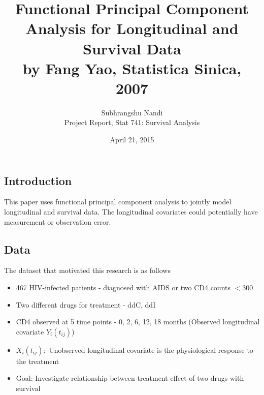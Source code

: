 \documentclass[11pt]{extarticle} %
\begin{document}

\title{Functional Principal Component Analysis for Longitudinal and Survival Data\\ by Fang Yao, Statistica Sinica, 2007}
\author{Subhrangshu Nandi\\
  Project Report, 
  Stat 741: Survival Analysis}
\date{April 21, 2015}

\maketitle


\subsection*{Introduction}
This paper uses functional principal component analysis to jointly model longitudinal and survival data. The longitudinal covariates could potentially have measurement or observation error. 

\subsection*{Data}
The dataset that motivated this research is as follows
\begin{itemize}
\item 467 HIV-infected patients - diagnosed with AIDS or two CD4 counts $< 300$
\item Two different drugs for treatment - ddC, ddI
\item CD4 observed at 5 time points - 0, 2, 6, 12, 18 months (Observed longitudinal covariate $Y_{i}(t_{ij})$)
\item $X_{i}(t_{ij}): $ Unobserved longitudinal covariate is the physiological response to the treatment
\item Goal: Investigate relationship between treatment effect of two drugs with survival
\end{itemize}
\end{document}
